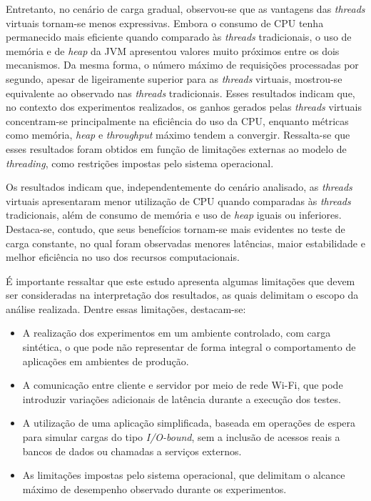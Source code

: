 \documentclass[12pt, openright, oneside, a4paper, english,	french,	spanish, brazil	]{abntex2}
\begin{document}
Entretanto, no cenário de carga gradual, observou-se que as vantagens das \textit{threads} virtuais tornam-se menos expressivas. Embora o consumo de CPU tenha permanecido mais eficiente quando comparado às \textit{threads} tradicionais, o uso de memória e de \textit{heap} da JVM apresentou valores muito próximos entre os dois mecanismos. Da mesma forma, o número máximo de requisições processadas por segundo, apesar de ligeiramente superior para as \textit{threads} virtuais, mostrou-se equivalente ao observado nas \textit{threads} tradicionais. Esses resultados indicam que, no contexto dos experimentos realizados, os ganhos gerados pelas \textit{threads} virtuais concentram-se principalmente na eficiência do uso da CPU, enquanto métricas como memória, \textit{heap} e \textit{throughput} máximo tendem a convergir. Ressalta-se que esses resultados foram obtidos em função de limitações externas ao modelo de \textit{threading}, como restrições impostas pelo sistema operacional.

Os resultados indicam que, independentemente do cenário analisado, as \textit{threads} virtuais apresentaram menor utilização de CPU quando comparadas às \textit{threads} tradicionais, além de consumo de memória e uso de \textit{heap} iguais ou inferiores. Destaca-se, contudo, que seus benefícios tornam-se mais evidentes no teste de carga constante, no qual foram observadas menores latências, maior estabilidade e melhor eficiência no uso dos recursos computacionais.

É importante ressaltar que este estudo apresenta algumas limitações que devem ser consideradas na interpretação dos resultados, as quais delimitam o escopo da análise realizada. Dentre essas limitações, destacam-se:

\begin{itemize}
    \item A realização dos experimentos em um ambiente controlado, com carga sintética, o que pode não representar de forma integral o comportamento de aplicações em ambientes de produção.
    
    \item A comunicação entre cliente e servidor por meio de rede Wi-Fi, que pode introduzir variações adicionais de latência durante a execução dos testes.
    
    \item A utilização de uma aplicação simplificada, baseada em operações de espera para simular cargas do tipo \textit{I/O-bound}, sem a inclusão de acessos reais a bancos de dados ou chamadas a serviços externos.
    
    \item As limitações impostas pelo sistema operacional, que delimitam o alcance máximo de desempenho observado durante os experimentos.
\end{itemize}
\end{document}
